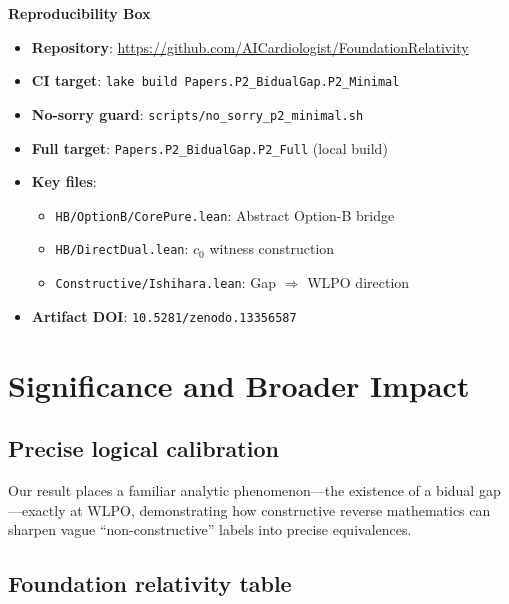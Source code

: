 \documentclass[11pt]{article}  %
\newcommand{\leanRepo}{\url{https://github.com/AICardiologist/FoundationRelativity}}
\newcommand{\WLPO}{\mathrm{WLPO}}
\begin{document}
\begin{mdframed}[backgroundcolor=gray!10]
\textbf{Reproducibility Box}
\begin{itemize}
\item \textbf{Repository}: \leanRepo
\item \textbf{CI target}: \texttt{lake build Papers.P2\_BidualGap.P2\_Minimal}
\item \textbf{No-sorry guard}: \texttt{scripts/no\_sorry\_p2\_minimal.sh}
\item \textbf{Full target}: \texttt{Papers.P2\_BidualGap.P2\_Full} (local build)
\item \textbf{Key files}:
  \begin{itemize}
  \item \texttt{HB/OptionB/CorePure.lean}: Abstract Option-B bridge
  \item \texttt{HB/DirectDual.lean}: $c_0$ witness construction
  \item \texttt{Constructive/Ishihara.lean}: Gap $\Rightarrow$ WLPO direction
  \end{itemize}
\item \textbf{Artifact DOI}: \texttt{10.5281/zenodo.13356587}
\end{itemize}
\end{mdframed}

\section{Significance and Broader Impact}

\subsection{Precise logical calibration}

Our result places a familiar analytic phenomenon---the existence of a bidual gap---exactly at $\WLPO$, demonstrating how constructive reverse mathematics can sharpen vague ``non-constructive'' labels into precise equivalences.

\subsection{Foundation relativity table}
\end{document}
